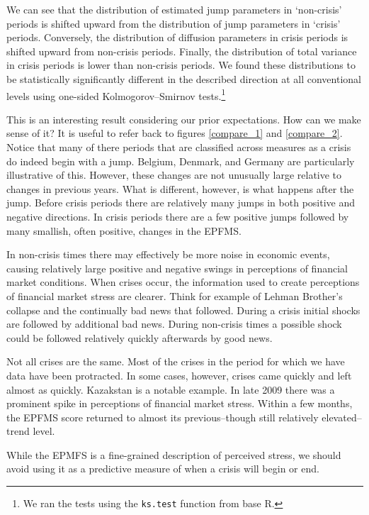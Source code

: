 \documentclass[]{article}
\begin{document}
We can see that the distribution of estimated jump parameters in `non-crisis' periods is shifted upward from the distribution of jump parameters in `crisis' periods. Conversely, the distribution of diffusion parameters in crisis periods is shifted upward from non-crisis periods. Finally, the distribution of total variance in crisis periods is lower than non-crisis periods. We found these distributions to be statistically significantly different in the described direction at all conventional levels using one-sided Kolmogorov–Smirnov tests.\footnote{We ran the tests using the \texttt{ks.test} function from base R.}

This is an interesting result considering our prior expectations. How can we make sense of it? It is useful to refer back to figures \ref{compare_1} and \ref{compare_2}. Notice that many of there periods that are classified across measures as a crisis do indeed begin with a jump. Belgium, Denmark, and Germany are particularly illustrative of this. However, these changes are not unusually large relative to changes in previous years. What is different, however, is what happens after the jump. Before crisis periods there are relatively many jumps in both positive and negative directions. In crisis periods there are a few positive jumps followed by many smallish, often positive, changes in the EPFMS.

In non-crisis times there may effectively be more noise in economic events, causing relatively large positive and negative swings in perceptions of financial market conditions. When crises occur, the information used to create perceptions of financial market stress are clearer. Think for example of Lehman Brother's collapse and the continually bad news that followed. During a crisis initial shocks are followed by additional bad news. During non-crisis times a possible shock could be followed relatively quickly afterwards by good news.

Not all crises are the same. Most of the crises in the period for which we have data have been protracted. In some cases, however, crises came quickly and left almost as quickly. Kazakstan is a notable example. In late 2009 there was a prominent spike in perceptions of financial market stress. Within a few months, the EPFMS score returned to almost its previous--though still relatively elevated--trend level.

While the EPMFS is a fine-grained description of perceived stress, we should avoid using it as a predictive measure of when a crisis will begin or end.
\end{document}
